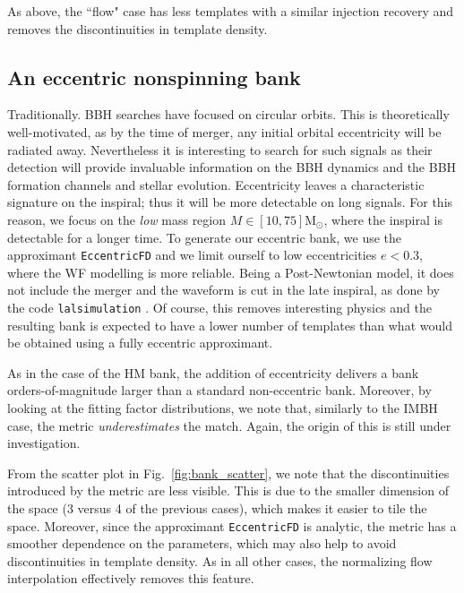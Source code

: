 \documentclass[twocolumn,showpacs,preprintnumbers,nofootinbib,prd,
superscriptaddress,10pt]{revtex4-2}
\begin{document}
As above, the ``flow" case has less templates with a similar injection recovery and removes the discontinuities in template density.

\subsection{An eccentric nonspinning bank}\label{sec:eccentric_bank}

Traditionally. BBH searches have focused on circular orbits.
This is theoretically well-motivated, as by the time of merger, any initial orbital eccentricity will be radiated away. Nevertheless it is interesting to search for such signals as their detection will provide invaluable information on the BBH dynamics and the BBH formation channels and stellar evolution.
Eccentricity leaves a characteristic signature on the inspiral; thus it will be more detectable on long signals. For this reason, we focus on the {\it low} mass region $M\in [10,75] \mathrm{M_\odot}$, where the inspiral is detectable for a longer time.
To generate our eccentric bank, we use the approximant \texttt{EccentricFD} \cite{PhysRevD.93.124061} and we limit ourself to low eccentricities $e<0.3$, where the WF modelling is more reliable. Being a Post-Newtonian model, it does not include the merger and the waveform is cut in the late inspiral, as done by the code \texttt{lalsimulation} \cite{lalsuite}. Of course, this removes interesting physics and the resulting bank is expected to have a lower number of templates than what would be obtained using a fully eccentric approximant.

As in the case of the HM bank, the addition of eccentricity delivers a bank orders-of-magnitude larger than a standard non-eccentric bank.
Moreover, by looking at the fitting factor distributions, we note that, similarly to the IMBH case, the metric {\it underestimates} the match. Again, the origin of this is still under investigation.

From the scatter plot in Fig.~\ref{fig:bank_scatter}, we note that the discontinuities introduced by the metric are less visible. This is due to the smaller dimension of the space (3 versus 4 of the previous cases), which makes it easier to tile the space. Moreover, since the approximant \texttt{EccentricFD} is analytic, the metric has a smoother dependence on the parameters, which may also help to avoid discontinuities in template density.
As in all other cases, the normalizing flow interpolation effectively removes this feature.
\end{document}

